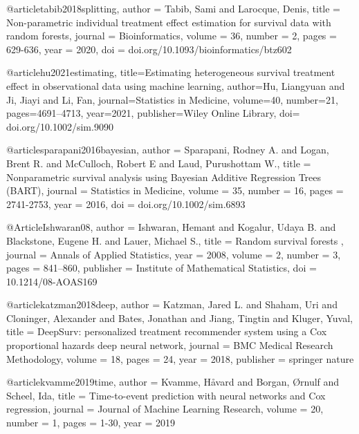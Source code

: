 @article{tabib2018splitting,
  author = {Tabib, Sami and Larocque, Denis},
  title = {Non-parametric individual treatment effect estimation for survival data with random forests},
  journal = {Bioinformatics},
  volume = {36},
  number = {2},
  pages = {629-636},
  year = {2020},
  doi = {doi.org/10.1093/bioinformatics/btz602}
}





@article{hu2021estimating,
  title={Estimating heterogeneous survival treatment effect in observational data using machine learning},
  author={Hu, Liangyuan and Ji, Jiayi and Li, Fan},
  journal={Statistics in Medicine},
  volume={40},
  number={21},
  pages={4691--4713},
  year={2021},
  publisher={Wiley Online Library},
  doi= {doi.org/10.1002/sim.9090}
}





@article{sparapani2016bayesian,
  author = {Sparapani, Rodney A. and Logan, Brent R. and McCulloch, Robert E and Laud, Purushottam W.},
  title = {Nonparametric survival analysis using Bayesian Additive Regression Trees (BART)},
  journal = {Statistics in Medicine},
  volume = {35},
  number = {16},
  pages = {2741-2753},
  year = {2016},
  doi = {doi.org/10.1002/sim.6893}
}





@Article{Ishwaran08,
   author = {Ishwaran, Hemant and Kogalur, Udaya B. and Blackstone, Eugene H. and Lauer, Michael S.},
   title = { Random survival forests },
   journal = {Annals of Applied Statistics},
   year = {2008},
   volume = {2},
   number = {3},
   pages = {841--860},
   publisher = {Institute of Mathematical Statistics},
   doi = {10.1214/08-AOAS169}
 }







@article{katzman2018deep,
  author = {Katzman, Jared L. and Shaham, Uri and Cloninger, Alexander and Bates, Jonathan and Jiang, Tingtin and Kluger, Yuval},
  title = {DeepSurv: personalized treatment recommender system using a Cox proportional hazards deep neural network},
  journal = {BMC Medical Research Methodology},
  volume = {18},
  pages = {24},
  year = {2018},
  publisher = {springer nature}
}






@article{kvamme2019time,
  author = {Kvamme, Håvard and Borgan, Ørnulf and Scheel, Ida},
  title = {Time-to-event prediction with neural networks and Cox regression},
  journal = {Journal of Machine Learning Research},
  volume = {20},
  number = {1},
  pages = {1-30},
  year = {2019}
}





